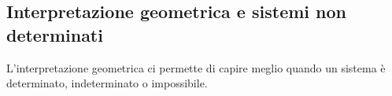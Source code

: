 % 
% 
% 
% 
% 
% 
% 
% 
%  

\subsection{Interpretazione geometrica e sistemi non determinati}
L'interpretazione geometrica ci permette di capire meglio quando un sistema è 
determinato, indeterminato o impossibile.

